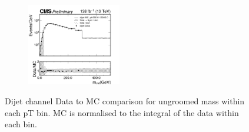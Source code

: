 \begin{figure}[h!]
\begin{subfigure}
  \end{subfigure}
  \begin{subfigure}
    \centering
    \includegraphics[width=0.45\textwidth]{figures/multijet/dijet/dijet_m_680_13000.png}
  \end{subfigure}
  \caption{Dijet channel  Data to MC comparison for ungroomed mass within each pT bin. MC is normalised to the integral of the data within each \pt bin.}
  \label{fig:17}
\end{figure}
